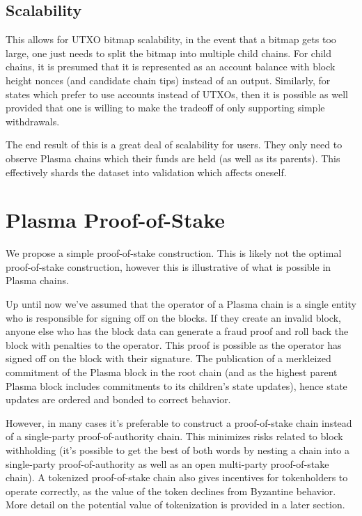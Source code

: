\documentclass[letterpaper, 11pt]{article}
\begin{document}
\subsection{Scalability}

This allows for UTXO bitmap scalability, in the event that a bitmap gets too
large, one just needs to split the bitmap into multiple child chains. For child
chains, it is presumed that it is represented as an account balance with block
height nonces (and candidate chain tips) instead of an output. Similarly, for
states which prefer to use accounts instead of UTXOs, then it is possible as
well provided that one is willing to make the tradeoff of only supporting simple
withdrawals.

The end result of this is a great deal of scalability for users. They only need
to observe Plasma chains which their funds are held (as well as its parents).
This effectively shards the dataset into validation which affects oneself.

\section{Plasma Proof-of-Stake}

We propose a simple proof-of-stake construction. This is likely not the optimal
proof-of-stake construction, however this is illustrative of what is possible in
Plasma chains.

Up until now we've assumed that the operator of a Plasma chain is a single
entity who is responsible for signing off on the blocks. If they create an
invalid block, anyone else who has the block data can generate a fraud proof and
roll back the block with penalties to the operator. This proof is possible as
the operator has signed off on the block with their signature. The publication
of a merkleized commitment of the Plasma block in the root chain (and as the
highest parent Plasma block includes commitments to its children's state
updates), hence state updates are ordered and bonded to correct behavior.

However, in many cases it's preferable to construct a proof-of-stake chain
instead of a single-party proof-of-authority chain. This minimizes risks related
to block withholding (it's possible to get the best of both words by nesting a
chain into a single-party proof-of-authority as well as an open multi-party
proof-of-stake chain). A tokenized proof-of-stake chain also gives incentives
for tokenholders to operate correctly, as the value of the token declines from
Byzantine behavior. More detail on the potential value of tokenization is
provided in a later section.
\end{document}
